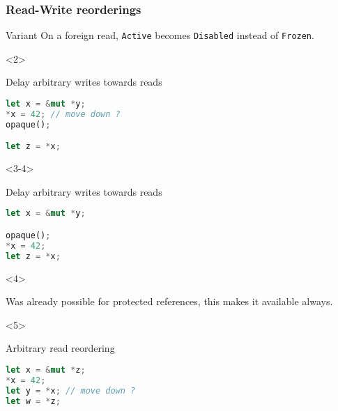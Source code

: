 

\begin{frame}[fragile, t]
    \frametitle{Read-Write reorderings}

    \begin{exampleblock}{Variant}
        On a foreign read, \texttt{Active} becomes \texttt{Disabled} instead of \texttt{Frozen}.
    \end{exampleblock}


    \begin{onlyenv}<2>
        \begin{block}{{\cmark} Delay arbitrary writes towards reads}
            \begin{lstlisting}[language=rust, basicstyle=\ttfamily\scriptsize]
let x = &mut *y;
*x = 42; // move down ?
opaque();

let z = *x;
            \end{lstlisting}
        \end{block}
    \end{onlyenv}

    \begin{onlyenv}<3-4>
        \begin{block}{{\cmark} Delay arbitrary writes towards reads}
            \begin{lstlisting}[language=rust, basicstyle=\ttfamily\scriptsize]
let x = &mut *y;

opaque();
*x = 42;
let z = *x;
            \end{lstlisting}
        \end{block}
    \end{onlyenv}

    \begin{onlyenv}<4>
        \begin{block}{}
            Was already possible for protected references,
            this makes it available always.
        \end{block}
    \end{onlyenv}


    \begin{onlyenv}<5>
        \begin{block}{{\xmark} Arbitrary read reordering}
            \begin{lstlisting}[language=rust]
let x = &mut *z;
*x = 42;
let y = *x; // move down ?
let w = *z;


\end{lstlisting}
\end{block}
\end{onlyenv}
\end{frame}
